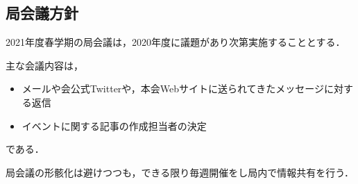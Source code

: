 \subsection*{局会議方針}


2021年度春学期の局会議は，2020年度に議題があり次第実施することとする．

主な会議内容は，
\begin{itemize}
    \item メールや会公式Twitterや，本会Webサイトに送られてきたメッセージに対する返信
    \item イベントに関する記事の作成担当者の決定
\end{itemize}
である．

局会議の形骸化は避けつつも，できる限り毎週開催をし局内で情報共有を行う．
